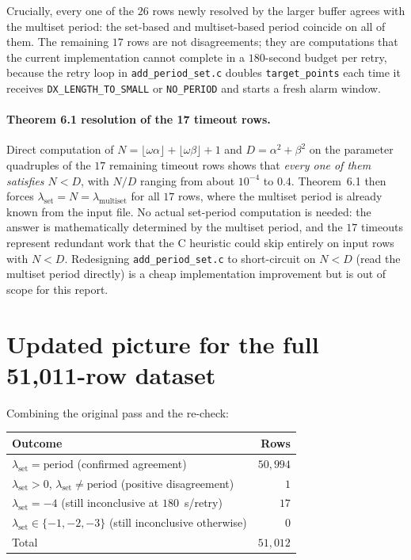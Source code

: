 \documentclass[11pt]{article}
\begin{document}
Crucially, every one of the $26$ rows newly resolved by the larger
buffer agrees with the multiset period: the set-based and multiset-based
period coincide on all of them. The remaining $17$ rows are not
disagreements; they are computations that the current implementation
cannot complete in a $180$-second budget per retry, because the retry
loop in \texttt{add\_period\_set.c} doubles \texttt{target\_points} each
time it receives \texttt{DX\_LENGTH\_TO\_SMALL} or \texttt{NO\_PERIOD}
and starts a fresh alarm window.

\paragraph{Theorem 6.1 resolution of the 17 timeout rows.}
Direct computation of $N = \lfloor\omega\alpha\rfloor +
\lfloor\omega\beta\rfloor + 1$ and $D = \alpha^2 + \beta^2$ on the
parameter quadruples of the $17$ remaining timeout rows shows that
\emph{every one of them satisfies $N < D$}, with $N/D$ ranging from
about $10^{-4}$ to $0.4$. Theorem~6.1 then forces
$\lambda_{\text{set}} = N = \lambda_{\text{multiset}}$ for all $17$
rows, where the multiset period is already known from the input file.
No actual set-period computation is needed: the answer is mathematically
determined by the multiset period, and the $17$ timeouts represent
redundant work that the C heuristic could skip entirely on input rows
with $N < D$. Redesigning \texttt{add\_period\_set.c} to short-circuit
on $N < D$ (read the multiset period directly) is a cheap implementation
improvement but is out of scope for this report.

\section*{Updated picture for the full 51{,}011-row dataset}

Combining the original pass and the re-check:

\begin{center}
\begin{tabular}{lr}
\toprule
Outcome & Rows \\
\midrule
$\lambda_{\text{set}} = \mathrm{period}$ (confirmed agreement) & $50{,}994$ \\
$\lambda_{\text{set}} > 0$, $\lambda_{\text{set}} \neq \mathrm{period}$ (positive disagreement) & $1$ \\
$\lambda_{\text{set}} = -4$ (still inconclusive at $180$~s/retry) & $17$ \\
$\lambda_{\text{set}} \in \{-1,-2,-3\}$ (still inconclusive otherwise) & $0$ \\
\midrule
Total                                                            & $51{,}012$ \\
\bottomrule
\end{tabular}
\end{center}
\end{document}
